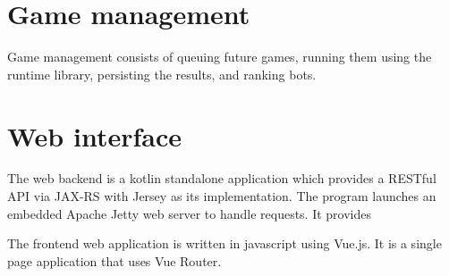 	\section{Game management}

	Game management consists of queuing future games, running them using the runtime library, persisting the results, and ranking bots.

	\section{Web interface}
	
	The web backend is a kotlin standalone application which provides a RESTful API via JAX-RS with Jersey as its implementation. The program launches an embedded Apache Jetty web server to handle requests. It provides 

	The frontend web application is written in javascript using Vue.js. It is a single page application that uses Vue Router. 

%













